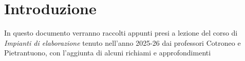 \chapter*{Introduzione}
In questo documento verranno raccolti appunti presi a lezione del corso di \textit{Impianti di elaborazione} tenuto nell'anno 2025-26 dai professori Cotroneo e Pietrantuono, con l'aggiunta di alcuni richiami e approfondimenti 
